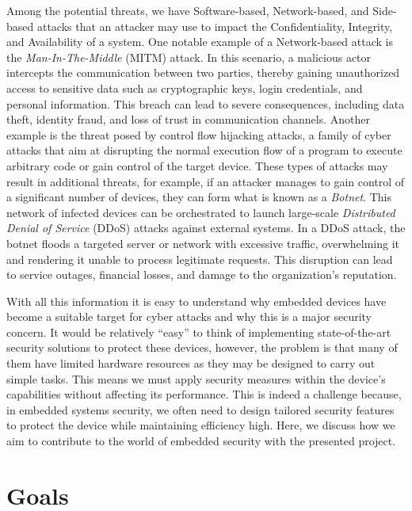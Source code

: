 Among the potential threats, we have Software-based, Network-based, and Side-based
attacks that an attacker may use to impact the Confidentiality, Integrity, and Availability
of a system. One notable example of a Network-based attack is the \textit{Man-In-The-Middle}
(MITM) attack. In this scenario, a malicious actor intercepts the communication between
two parties, thereby gaining unauthorized access to sensitive data such as
cryptographic keys, login credentials, and personal information. This breach can
lead to severe consequences, including data theft, identity fraud, and loss of
trust in communication channels. Another example is the threat posed by control flow
hijacking attacks, a family of cyber attacks that aim at disrupting the normal
execution flow of a program to execute arbitrary code or gain control of the
target device. These types of attacks may result in additional threats, for
example, if an attacker manages to gain control of a significant number of devices,
they can form what is known as a \textit{Botnet}. This network of infected
devices can be orchestrated to launch large-scale \textit{Distributed Denial of
Service} (DDoS) attacks against external systems. In a DDoS attack, the botnet floods
a targeted server or network with excessive traffic, overwhelming it and
rendering it unable to process legitimate requests. This disruption can lead to service
outages, financial losses, and damage to the organization's reputation.

With all this information it is easy to understand why embedded devices have become
a suitable target for cyber attacks and why this is a major security concern. It
would be relatively ``easy'' to think of implementing state-of-the-art security
solutions to protect these devices, however, the problem is that many of them
have limited hardware resources as they may be designed to carry out simple
tasks. This means we must apply security measures within the device's capabilities
without affecting its performance. This is indeed a challenge because, in embedded
systems security, we often need to design tailored security features to protect
the device while maintaining efficiency high. Here, we discuss how we aim to
contribute to the world of embedded security with the presented project.

\section{Goals}
\label{sec:intro_goals}

